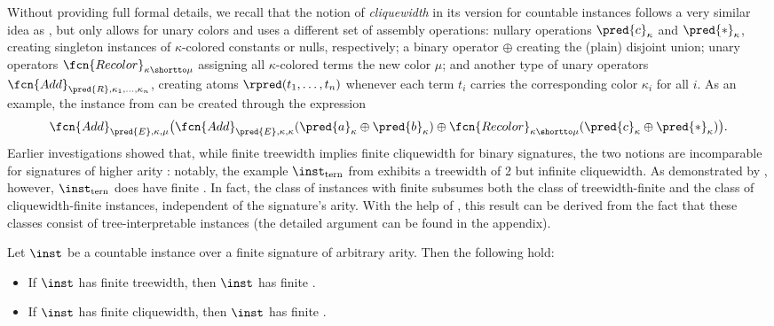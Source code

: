 Without providing full formal details, we recall that the notion of \emph{cliquewidth} in its version for countable instances \cite{ICDT2023} follows a very similar idea as \ercwidth{}, but only allows for unary colors and uses a different set of assembly operations: nullary operations $\pred{c}_\kappa$ and $\pred{*}_\kappa$, creating singleton instances of $\kappa$-colored constants or nulls, respectively;
a binary operator $\oplus$ creating the (plain) disjoint union; unary operators $\fcn{Recolor}_{\kappa\shortto\mu}$ assigning all $\kappa$-colored terms the new color $\mu$; and another type of unary operators $\fcn{Add}_{\pred{R},\kappa_1,...,\kappa_n}$, creating atoms $\rpred(t_1,\ldots,t_n)$ whenever each term $t_i$ carries the corresponding color $\kappa_i$ for all $i$. As an example, the instance from  can be created through the expression
$$ \fcn{Add}_{\pred{E},\kappa,\mu}\big(\fcn{Add}_{\pred{E},\kappa,\kappa}(\pred{a}_\kappa \oplus \pred{b}_\kappa)  \oplus \fcn{Recolor}_{\kappa\shortto\mu}( \pred{c}_\kappa \oplus \pred{*}_\kappa )\big). $$%
Earlier investigations showed that, while finite treewidth implies finite cliquewidth for binary signatures, the two notions are incomparable for signatures of higher arity \cite{ICDT2023}: notably, the example $\inst_\mathrm{tern}$ from  exhibits a treewidth of 2 but infinite cliquewidth.
%
As demonstrated by , however, $\inst_\mathrm{tern}$ does have finite \ercwidth{}. In fact, the class of instances with finite \ercwidth{} subsumes both the class of treewidth-finite and the class of cliquewidth-finite instances, independent of the signature's arity. With the help of , this result can be derived from the fact that these classes consist of tree-interpretable instances (the detailed argument can be found in the appendix).

\begin{theorem}\label{thm:tree-width-implies-clique-width}
Let $\inst$ be a countable instance over a finite signature of arbitrary arity. Then the following hold:
\begin{itemize}
    \item If $\inst$ has finite treewidth, then $\inst$ has finite \ercwidth{}.
    \item If $\inst$ has finite cliquewidth, then $\inst$ has finite \ercwidth{}.
\end{itemize}
\end{theorem}




